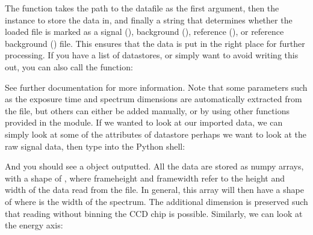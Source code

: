 \documentclass[a4paper,10pt,english]{sphinxmanual}
\begin{document}
\sphinxAtStartPar
The function  takes the path to the datafile as the first argument, then the  instance to store the data in, and finally a string that determines whether the loaded file is marked as a signal (), background (), reference (), or reference background () file. This ensures that the data is put in the right place for further processing. If you have a list of datastores, or simply want to avoid writing this out, you can also call the function:

\begin{sphinxVerbatim}[commandchars=\\\{\}]
     
\end{sphinxVerbatim}

\sphinxAtStartPar
See further documentation for more information. Note that some parameters such as the exposure time and spectrum dimensions are automatically extracted from the  file, but others can either be added manually, or by using other functions provided in the module. If we wanted to look at our imported data, we can simply look at some of the attributes of datastore \sphinxhyphen{} perhaps we want to look at the raw signal data, then type into the Python shell:

\begin{sphinxVerbatim}[commandchars=\\\{\}]
\end{sphinxVerbatim}

\sphinxAtStartPar
And you should see a  object outputted. All the data are stored as numpy arrays, with a shape of , where frameheight and framewidth refer to the height and width of the data read from the  file. In general, this array will then have a shape of  where  is the width of the spectrum. The additional dimension is preserved such that reading without binning the CCD chip is possible. Similarly, we can look at the energy axis:
\end{document}

